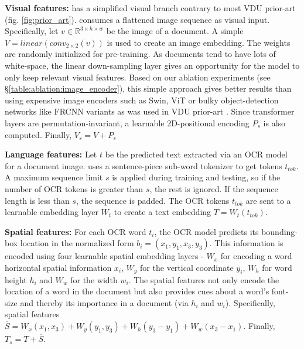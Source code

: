 \documentclass[10pt,twocolumn,letterpaper]{article}
\begin{document}
\label{sec:approach:arch:visual}
\noindent\textbf{Visual features:} \papertitleshort has a simplified visual branch contrary to most VDU prior-art (fig. \ref{fig:prior_art}). \papertitleshort consumes a flattened image sequence as visual input. Specifically, let $v \in \mathbb{R}^{3 \times h \times w}$ be the image of a document. A simple $V = linear( conv_{2\times2} ( v ) )$ is used to create an image embedding. The weights are randomly initialized for pre-training. As documents tend to have lots of white-space, the linear down-sampling layer gives an opportunity for the model to only keep relevant visual features. Based on our ablation experiments (see \S \ref{table:ablation:image_encoder}), this simple approach gives better results than using expensive image encoders such as Swin, ViT  \cite{Liu2021Swin, dosovitskiy2020image, Ronneberger2015UNet} or bulky object-detection networks like FRCNN variants \cite{Ren2015FasterFRCNN} as was used in VDU prior-art \cite{powalski2021going,appalaraju2021docformer,xu2021layoutlmv2}.
Since transformer layers are permutation-invariant, a learnable 2D-positional encoding $P_s$ is also computed. Finally, $V_s = V + P_s $


\label{sec:approach:arch:language}
\noindent\textbf{Language features:} Let $t$ be the predicted text extracted via an OCR model for a document image. \papertitleshort uses a sentence-piece sub-word tokenizer \cite{Kudo2018SentencePiece} to get tokens $t_{tok}$. A maximum sequence limit $s$ is applied during training and testing, so if the number of OCR tokens is greater than $s$, the rest is ignored. If the sequence length is less than $s$, the sequence is padded. The OCR tokens $t_{tok}$ are sent to a learnable embedding layer $W_t$ to create a text embedding $T= W_t(t_{tok})$.

\label{sec:approach:arch:spatial}
\noindent\textbf{Spatial features:} For each OCR word $t_i$, the OCR model predicts its bounding-box location in the normalized form $b_i = (x_1,y_1,x_3,y_3)$. This information is encoded using four learnable spatial embedding layers - $W_x$ for encoding a word horizontal spatial information $x_i$, $W_y$ for the vertical coordinate $y_i$, $W_h$ for word height $h_i$ and $W_w$ for the width $w_i$. The spatial features not only encode the location of a word in the document but also provides cues about a word's font-size and thereby its importance in a document (via $h_i$ and $w_i$). Specifically, spatial features  $\overline{S}= W_x(x_1, x_3) + W_y(y_1, y_3) + W_h(y_3-y_1) + W_w(x_3-x_1)$.  Finally, $T_s = T + \overline{S}$.
\end{document}

